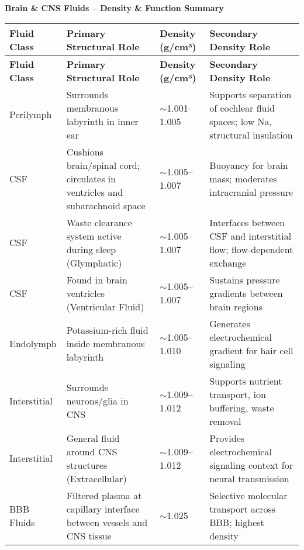 \documentclass{article}
\begin{document}
\begin{center}
\Large\textbf{Brain \& CNS Fluids – Density \& Function Summary}
\end{center}

\begin{longtable}{@{}>{\raggedright\arraybackslash}p{2.5cm}%
                        >{\raggedright\arraybackslash}p{4.5cm}%
                        >{\centering\arraybackslash}p{2.8cm}%
                        >{\raggedright\arraybackslash}p{4.5cm}@{}}
\toprule
\textbf{Fluid Class} & \textbf{Primary Structural Role} & \textbf{Density (g/cm³)} & \textbf{Secondary Density Role} \\
\midrule
\endfirsthead
\toprule
\textbf{Fluid Class} & \textbf{Primary Structural Role} & \textbf{Density (g/cm³)} & \textbf{Secondary Density Role} \\
\midrule
\endhead

Perilymph &
Surrounds membranous labyrinth in inner ear &
$\sim$1.001–1.005 &
Supports separation of cochlear fluid spaces; low Na, structural insulation \\
\addlinespace

CSF &
Cushions brain/spinal cord; circulates in ventricles and subarachnoid space &
$\sim$1.005–1.007 &
Buoyancy for brain mass; moderates intracranial pressure \\
\addlinespace

CSF &
Waste clearance system active during sleep (Glymphatic) &
$\sim$1.005–1.007 &
Interfaces between CSF and interstitial flow; flow-dependent exchange \\
\addlinespace

CSF &
Found in brain ventricles (Ventricular Fluid) &
$\sim$1.005–1.007 &
Sustains pressure gradients between brain regions \\
\addlinespace

Endolymph &
Potassium-rich fluid inside membranous labyrinth &
$\sim$1.005–1.010 &
Generates electrochemical gradient for hair cell signaling \\
\addlinespace

Interstitial &
Surrounds neurons/glia in CNS &
$\sim$1.009–1.012 &
Supports nutrient transport, ion buffering, waste removal \\
\addlinespace

Interstitial &
General fluid around CNS structures (Extracellular) &
$\sim$1.009–1.012 &
Provides electrochemical signaling context for neural transmission \\
\addlinespace

BBB Fluids &
Filtered plasma at capillary interface between vessels and CNS tissue &
$\sim$1.025 &
Selective molecular transport across BBB; highest density \\
\bottomrule
\end{longtable}
\end{document}
